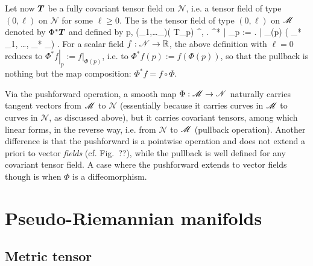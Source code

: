 Let now $\bm{T}$ be a fully covariant tensor field on $\mathscr{N}$, i.e. a tensor field
of type $(0,\ell)$ on $\mathscr{N}$ for some $\ell \geq 0$. The
is the tensor field of type $(0,\ell)$ on $\mathscr{M}$ denoted by
$\Phi^*\bm{T}$ and
defined by
\be \label{e:bas:def_pullback}
    \forall p\in\M,\quad
    \forall (_1,\ldots{}_\ell)\in \left( T_p\M \right) ^\ell,\quad
    \left. \Phi^*  \right| _p := \left.  \right| _{\Phi(p)}
    \left( \Phi_* _1, \ldots, \Phi_* _\ell \right) .
\ee
For a scalar field $f: \mathscr{N}\to \mathbb{R}$, the above definition with $\ell = 0$ reduces
to $\left. \Phi^* f \right| _p := \left. f \right| _{\Phi(p)}$,
i.e. to $ \Phi^* f(p) := f(\Phi(p))$, so that
the pullback is nothing but the map composition:
$\Phi^* f = f \circ \Phi$.

\begin{remark} \label{r:bas:comp_push_pull}
Via the pushforward operation,
a smooth map $\Phi : \mathscr{M} \to \mathscr{N}$ naturally carries tangent vectors from $\mathscr{M}$ to $\mathscr{N}$
(essentially because it carries curves in $\mathscr{M}$ to curves in $\mathscr{N}$, as discussed above), but
it carries covariant tensors, among which linear forms, in the reverse way, i.e. from
$\mathscr{N}$ to $\mathscr{M}$ (pullback operation). Another difference is that
the pushforward is a pointwise operation and does not extend a priori to vector \emph{fields}
(cf. Fig.~??),
while the pullback is well defined for any covariant tensor field. A case where the
pushforward extends to vector fields though is when $\Phi$ is a diffeomorphism.
\end{remark}



\section{Pseudo-Riemannian manifolds} \label{s:bas:pRiemManif}

\subsection{Metric tensor} \label{s:bas:metric}

